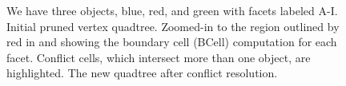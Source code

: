 \documentclass[final,3p,times,twocolumn]{elsarticle}
\begin{document}
\begin{figure}




  \caption{
    We have three objects, blue, red, and green with facets labeled A-I.
    \protect{} Initial pruned vertex quadtree.
    \protect{} Zoomed-in to the region outlined by red in \protect{} and showing the boundary cell (BCell) computation for each facet. %
    \protect{} Conflict cells, which intersect more than one object, are highlighted.
    \protect{} The new quadtree after conflict resolution.
  }
  \label{fig:conflict-find}
\end{figure}
\end{document}
